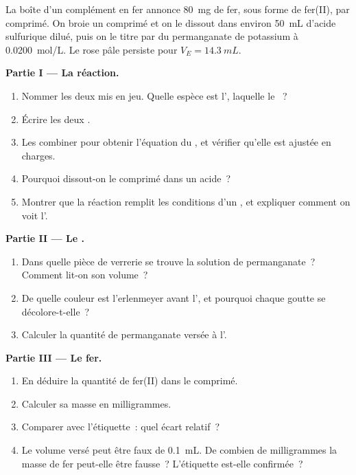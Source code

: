 \begin{problem}
\label{pb:g11:titration:1}
La boîte d'un complément en fer annonce \qty{80}{mg} de fer, sous forme
de fer(II), par comprimé. On broie un comprimé et on le dissout dans
environ \qty{50}{mL} d'acide sulfurique dilué, puis on le titre par du
permanganate de potassium à \qty{0.0200}{mol/L}. Le rose pâle persiste
pour $V_E = \qty{14.3}{mL}$.

\medskip
\noindent\textbf{Partie I --- La réaction.}
\begin{enumerate}
  \item Nommer les deux  mis en jeu. Quelle
        espèce est l', laquelle le ~?
  \item Écrire les deux .
  \item Les combiner pour obtenir l'équation du , et vérifier
        qu'elle est ajustée en charges.
  \item Pourquoi dissout-on le comprimé dans un acide~?
  \item Montrer que la réaction remplit les conditions d'un , et
        expliquer comment on voit l'.
\end{enumerate}

\medskip
\noindent\textbf{Partie II --- Le .}
\begin{enumerate}[resume]
  \item Dans quelle pièce de verrerie se trouve la solution de
        permanganate~? Comment lit-on son volume~?
  \item De quelle couleur est l'erlenmeyer avant l', et
        pourquoi chaque goutte se décolore-t-elle~?
  \item Calculer la quantité de permanganate versée à l'.
\end{enumerate}

\medskip
\noindent\textbf{Partie III --- Le fer.}
\begin{enumerate}[resume]
  \item En déduire la quantité de fer(II) dans le comprimé.
  \item Calculer sa masse en milligrammes.
  \item Comparer avec l'étiquette~: quel écart relatif~?
  \item Le volume versé peut être faux de \qty{0.1}{mL}. De combien de
        milligrammes la masse de fer peut-elle être fausse~? L'étiquette
        est-elle confirmée~?
\end{enumerate}


\end{problem}

